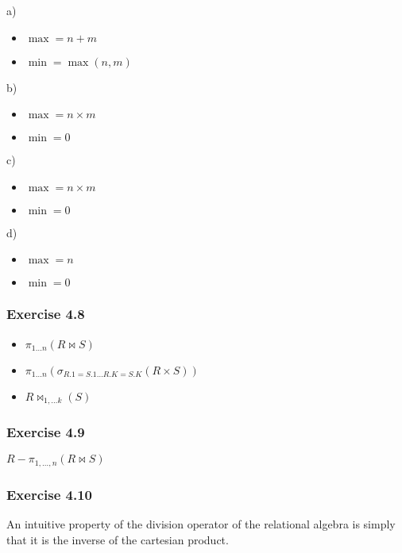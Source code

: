 \documentclass[../../main.tex]{subfiles}
\begin{document}
a)

\begin{itemize}
  \item $\max =  n + m$
  \item $\min = \max(n, m)$
\end{itemize}

b)

\begin{itemize}
  \item $\max = n \times m$
  \item $\min = 0$
\end{itemize}

c)

\begin{itemize}
  \item $\max = n \times m$
  \item $\min = 0$
\end{itemize}

d)

\begin{itemize}
  \item $\max = n$
  \item $\min = 0$
\end{itemize}

\subsubsection*{Exercise 4.8}

\begin{itemize}
  \item $\pi_{1\dots n}(R \bowtie S)$
  \item $\pi_{1\dots n}(\sigma_{R.1=S.1
        \dots R.K=S.K}(R \times S))$
  \item $R \bowtie_{1, \dots k}(S)$
\end{itemize}

\subsubsection*{Exercise 4.9}

$R - \pi_{1,\dots,n}(R \bowtie S)$

\subsubsection*{Exercise 4.10}

An intuitive property of the division operator of
the relational algebra is simply that it is the inverse
of the cartesian product.
\end{document}
